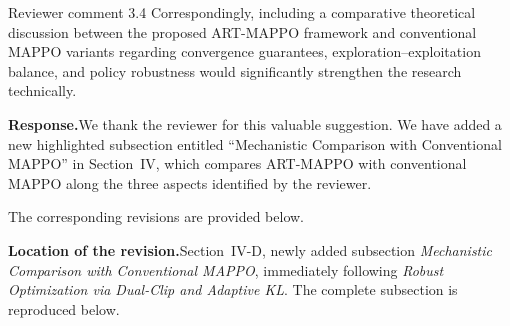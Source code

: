 \documentclass[11pt]{article}
\newcommand{\rsp}{\medskip\noindent\textbf{Response.}\quad}
\newcommand{\loc}{\medskip\noindent\textbf{Location of the revision.}\quad}
\begin{document}
\begin{reviewercomment}{Reviewer comment 3.4}
Correspondingly, including a comparative theoretical discussion between the
proposed ART-MAPPO framework and conventional MAPPO variants regarding
convergence guarantees, exploration--exploitation balance, and policy
robustness would significantly strengthen the research technically.
\end{reviewercomment}

\rsp We thank the reviewer for this valuable suggestion. We have added a new
highlighted subsection entitled ``Mechanistic Comparison with Conventional
MAPPO'' in Section~IV, which compares ART-MAPPO with conventional MAPPO along
the three aspects identified by the reviewer.

The corresponding revisions are provided below.


\loc Section~IV-D, newly added subsection \emph{Mechanistic Comparison with
Conventional MAPPO}, immediately following
\emph{Robust Optimization via Dual-Clip and Adaptive KL}. The complete
subsection is reproduced below.
\end{document}
